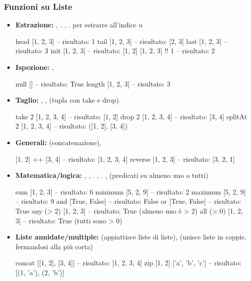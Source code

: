 \subsubsection{Funzioni su Liste}
\begin{itemize}
    \item \textbf{Estrazione:} , . , . \code{(!!)} per estrarre all'indice $n$
        \begin{haskellbox}{}
head [1, 2, 3]  -- risultato: 1
tail [1, 2, 3]  -- risultato: [2, 3]
last [1, 2, 3]  -- risultato: 3
init [1, 2, 3]  -- risultato: [1, 2]
[1, 2, 3] !! 1  -- risultato: 2
\end{haskellbox}{}

    \item \textbf{Ispezione:} , 
\begin{haskellbox}{}
null []          -- risultato: True
length [1, 2, 3] -- risultato: 3
\end{haskellbox}{}

    \item \textbf{Taglio:} , ,  (tupla con take e drop).
\begin{haskellbox}{}
take 2 [1, 2, 3, 4]    -- risultato: [1, 2]
drop 2 [1, 2, 3, 4]    -- risultato: [3, 4]
splitAt 2 [1, 2, 3, 4] -- risultato: ([1, 2], [3, 4])
\end{haskellbox}{}

    \item \textbf{Generali:} \code{++} (concatenazione), 
\begin{haskellbox}{}
[1, 2] ++ [3, 4]  -- risultato: [1, 2, 3, 4]
reverse [1, 2, 3] -- risultato: [3, 2, 1]
\end{haskellbox}{}

    \item \textbf{Matematica/logica:} , , . , . ,  (predicati su almeno uno o tutti)
        \begin{haskellbox}{}
sum [1, 2, 3]       -- risultato: 6
minimum [5, 2, 9]   -- risultato: 2
maximum [5, 2, 9]   -- risultato: 9
and [True, False]   -- risultato: False
or [True, False]    -- risultato: True
any (> 2) [1, 2, 3] -- risultato: True (almeno uno è > 2)
all (> 0) [1, 2, 3] -- risultato: True (tutti sono > 0)
\end{haskellbox}{}

    \item \textbf{Liste annidate/multiple:}  (appiattisce liste di liste),  (unisce liste in coppie, fermandosi alla più corta)
\begin{haskellbox}{}
concat [[1, 2], [3, 4]]    -- risultato: [1, 2, 3, 4]
zip [1, 2] ['a', 'b', 'c'] -- risultato: [(1, 'a'), (2, 'b')]
\end{haskellbox}{}
\end{itemize}

